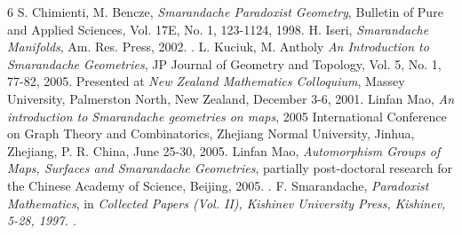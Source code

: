 \documentclass[12pt]{article}
\begin{document}
\begin{thebibliography} {6}
 S. Chimienti, M. Bencze, {\em Smarandache Paradoxist Geometry}, Bulletin of Pure and Applied Sciences, Vol. 17E, No. 1, 123-1124, 1998.
 H. Iseri, {\em Smarandache Manifolds}, Am. Res. Press, 2002.
.
 L. Kuciuk, M. Antholy {\em An Introduction to Smarandache Geometries}, JP Journal of Geometry and Topology, Vol. 5, No. 1, 77-82, 2005.  
\newline Presented at {\em New Zealand Mathematics Colloquium}, Massey University, Palmerston North, New Zealand, December 3-6, 2001.
 Linfan Mao, {\em An introduction to Smarandache geometries on maps}, 2005 International Conference on Graph Theory and Combinatorics, Zhejiang Normal University,  Jinhua, Zhejiang, P. R. China, June 25-30, 2005.
 Linfan Mao, {\em Automorphism Groups of Maps, Surfaces and Smarandache Geometries}, partially post-doctoral research for the Chinese Academy of Science, Beijing, 2005.
\newblock {}.
 F. Smarandache, {\em Paradoxist Mathematics}, in \it {Collected Papers (Vol. II)}, Kishinev University Press, Kishinev, 5-28, 1997.  
.
\end{thebibliography}
\end{document}
